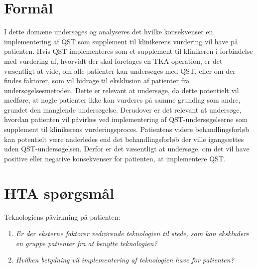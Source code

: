 \section{Formål}
I dette domæne undersøges og analyseres det hvilke konsekvenser en implementering af QST som supplement til klinikerens vurdering vil have på patienten. Hvis QST implementeres som et supplement til klinikeren i forbindelse med vurdering af, hvorvidt der skal foretages en TKA-operation, er det væsentligt at vide, om alle patienter kan undersøges med QST, eller om der findes faktorer, som vil bidrage til eksklusion af patienter fra undersøgelsesmetoden. Dette er relevant at undersøge, da dette potentielt vil medføre, at nogle patienter ikke kan vurderes på samme grundlag som andre, grundet den manglende undersøgelse. Derudover er det relevant at undersøge, hvordan patienten vil påvirkes ved implementering af QST-undersøgelserne som supplement til klinikerens vurderingsproces. Patientens videre behandlingsforløb kan potentielt være anderledes end det behandlingsforløb der ville igangsættes uden QST-undersøgelsen. Derfor er det væsentligt at undersøge, om det vil have positive eller negative konsekvenser for patienten, at implementere QST.
 
\section{HTA spørgsmål}
Teknologiens påvirkning på patienten:
\begin{enumerate}
\item \textit{Er der eksterne faktorer vedrørende teknologien til stede, som kan  ekskludere en gruppe patienter fra at benytte teknologien?} %
\item \textit{Hvilken betydning vil implementering af teknologien have for patienten?} %
\end{enumerate}


